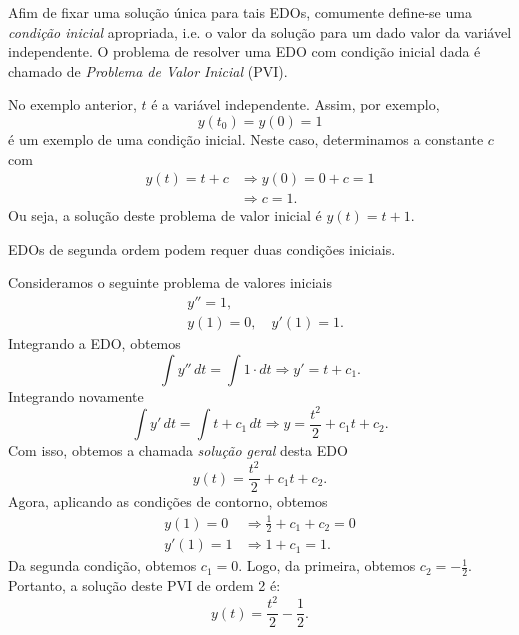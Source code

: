 Afim de fixar uma solução única para tais EDOs, comumente define-se uma \emph{condição inicial} apropriada, i.e. o valor da solução para um dado valor da variável independente. O problema de resolver uma EDO com condição inicial dada é chamado de \emph{Problema de Valor Inicial} (PVI).

\begin{ex}
  No exemplo anterior, $t$ é a variável independente. Assim, por exemplo,
\begin{equation}
  y(t_0) = y(0) = 1
\end{equation}
é um exemplo de uma condição inicial. Neste caso, determinamos a constante $c$ com
\begin{align}
  y(t) = t + c &\Rightarrow y(0) = 0 + c = 1 \\
               &\Rightarrow c = 1.
\end{align}
Ou seja, a solução deste problema de valor inicial é $y(t) = t + 1$.
\end{ex}


EDOs de segunda ordem podem requer duas condições iniciais.

\begin{ex}
Consideramos o seguinte problema de valores iniciais
\begin{align}
  &y'' = 1,\\
  &y(1) = 0,\quad y'(1) = 1.
\end{align}
Integrando a EDO, obtemos
\begin{equation}
  \int y''\,dt = \int 1\cdot dt \Rightarrow y' = t + c_1.
\end{equation}
Integrando novamente
\begin{equation}
  \int y'\,dt = \int t + c_1\,dt \Rightarrow y = \frac{t^2}{2} + c_1t + c_2.
\end{equation}
Com isso, obtemos a chamada \emph{solução geral} desta EDO
\begin{equation}
  y(t) = \frac{t^2}{2} + c_1t + c_2.
\end{equation}
Agora, aplicando as condições de contorno, obtemos
\begin{align}
  y(1) = 0 &\Rightarrow \frac{1}{2} + c_1 + c_2 = 0\\
  y'(1) = 1 &\Rightarrow 1 + c_1 = 1.
\end{align}
Da segunda condição, obtemos $c_1 = 0$. Logo, da primeira, obtemos $c_2 = -\frac{1}{2}$. Portanto, a solução deste PVI de ordem 2 é:
\begin{equation}
  y(t) = \frac{t^2}{2} - \frac{1}{2}.
\end{equation}
\end{ex}


